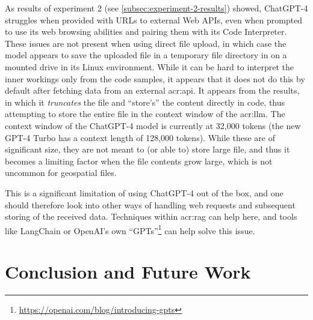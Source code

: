 As results of experiment 2 (see \autoref{subsec:experiment-2-results}) showed, ChatGPT-4 struggles when provided with URLs to external Web APIs, even when prompted to use its web browsing abilities and pairing them with its Code Interpreter. These issues are not present when using direct file upload, in which case the model appears to save the uploaded file in a temporary file directory in on a mounted drive in its Linux environment. While it can be hard to interpret the inner workings only from the code samples, it appears that it does not do this by default after fetching data from an external \acrshort{acr:api}. It appears from the results, in which it \textit{truncates} the file and \enquote{store's} the content directly in code, thus attempting to store the entire file in the context window of the  \acrshort{acr:llm}. The context window of the ChatGPT-4 model is currently at 32,000 tokens (the new GPT-4 Turbo has a context length of 128,000 tokens). While these are of significant size, they are not meant to (or able to) store large file, and thus it becomes a limiting factor when the file contents grow large, which is not uncommon for geospatial files.

This is a significant limitation of using ChatGPT-4 out of the box, and one should therefore look into other ways of handling web requests and subsequent storing of the received data. Techniques within \gls{acr:rag} can help here, and tools like LangChain or OpenAI's own \enquote{GPTs}\footnote{\url{https://openai.com/blog/introducing-gpts}} can help solve this issue.

\section{Conclusion and Future Work}\label{sec:conclusion-and-future-work}

